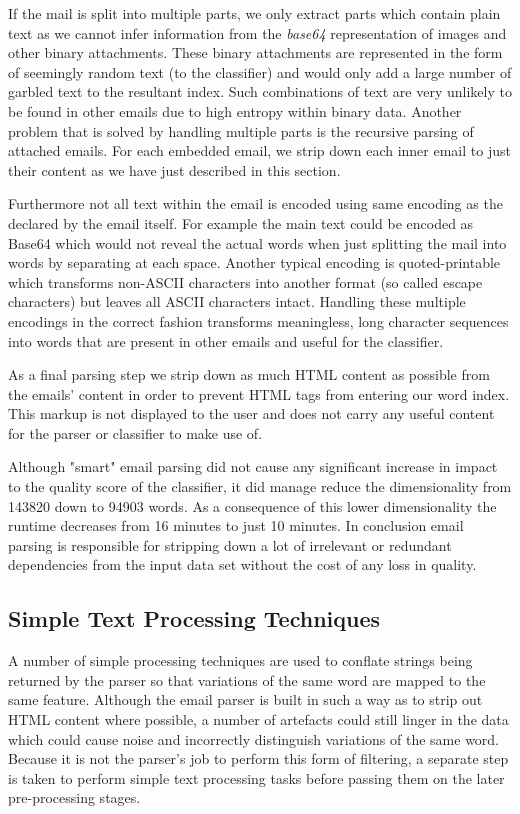 If the mail is split into multiple parts, we only extract parts which contain plain text as we cannot infer information from the \emph{base64} representation of images and other binary attachments.
These binary attachments are represented in the form of seemingly random text (to the classifier) and would only add a large number of garbled text \cite{rfc2045} to the resultant index. Such combinations of text are very unlikely to be found in other emails due to high entropy within binary data.
Another problem that is solved by handling multiple parts is the recursive parsing of attached emails. For each embedded email, we strip down each inner email to just their content as we have just described in this section.

Furthermore not all text within the email is encoded using same encoding as the declared by the email itself. For example the main text could be encoded as Base64 which would not reveal the actual words when just splitting the mail into words by separating at each space.
Another typical encoding is quoted-printable which transforms non-ASCII characters into another format (so called escape characters) but leaves all ASCII characters intact.
Handling these multiple encodings in the correct fashion transforms meaningless, long character sequences into words that are present in other emails and useful for the classifier.

As a final parsing step we strip down as much HTML content as possible from the emails' content in order to prevent HTML tags from entering our word index.
This markup is not displayed to the user and does not carry any useful content for the parser or classifier to make use of.

Although "smart" email parsing did not cause any significant increase in impact to the quality score of the classifier, it did manage reduce the dimensionality from 143820 down to 94903 words.
As a consequence of this lower dimensionality the runtime decreases from 16 minutes to just 10 minutes.
In conclusion email parsing is responsible for stripping down a lot of irrelevant or redundant dependencies from the input data set without the cost of any loss in quality.

\subsection{Simple Text Processing Techniques}

A number of simple processing techniques are used to conflate strings being returned by the parser so that variations of the same word are mapped to the same feature. Although the email parser is built in such a way as to strip out HTML content where possible, a number of artefacts could still linger in the data which could cause noise and incorrectly distinguish variations of the same word. Because it is not the parser's job to perform this form of filtering, a separate step is taken to perform simple text processing tasks before passing them on the later pre-processing stages.

